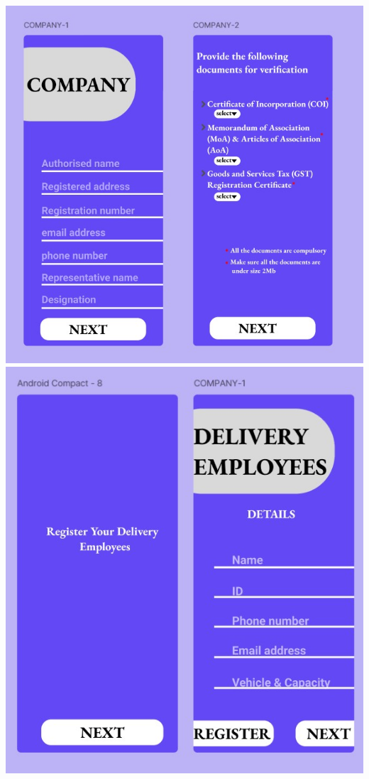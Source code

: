 \documentclass{article}
\begin{document}
\newpage
\hspace*{3cm}
\includegraphics[scale=0.75]{company1.jpg}
\\
\hspace*{3.6cm}
\includegraphics[scale=0.75]{company2.jpg}
\end{document}
